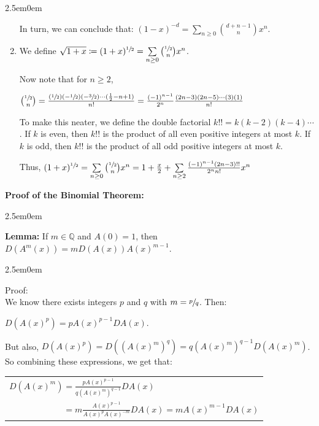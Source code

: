 \documentclass{book}
\newcommand{\hTwo}{%
\color{MidnightBlue}%
   \fontsize{13}{15}\selectfont%
}
\newcommand{\hThree}{%
   \color{PineGreen!85!Orange}
   \fontsize{12}{14}\selectfont%
}
\newcommand{\hFour}{%
   \color{Cyan}
   \fontsize{12}{14}\selectfont%
}
\newenvironment{myIndent}{%
   \begin{adjustwidth}{2.5em}{0em}%
}{%
   \end{adjustwidth}%
}
\newcommand{\blab}[1]{\textbf{#1}}
\newcommand{\retTwo}{\hfill\bigbreak}
\begin{document}
\begin{myIndent}
\begin{enumerate}
      In turn, we can conclude that: $(1 - x)^{-d} = \sum\limits_{n \geq 0}\binom{d+n-1}{n}x^n$.\retTwo

      \item We define $\sqrt{1 + x} \coloneq (1 + x)^{\sfrac{1}{2}} = \sum\limits_{n \geq 0}\binom{\sfrac{1}{2}}{n}x^n$.\retTwo
      
      Now note that for $n \geq 2$,
      
      {\centering$\binom{\sfrac{1}{2}}{n} = \frac{(\sfrac{1}{2})(-\sfrac{1}{2})(-\sfrac{3}{2})\cdots(\frac{1}{2} - n + 1)}{n!} = \frac{(-1)^{n-1}}{2^n}\frac{(2n-3)(2n - 5)\cdots(3)(1)}{n!}$\retTwo\par}

      To make this neater, we define the double factorial $k!! = k(k-2)(k-4)\cdots$. If $k$ is even, then $k!!$ is the product of all even positive integers at most $k$. If $k$ is odd, then $k!!$ is the product of all odd positive integers at most $k$.\retTwo

      Thus, $(1 + x)^{\sfrac{1}{2}}  = \sum\limits_{n \geq 0}\binom{\sfrac{1}{2}}{n}x^n = 1 + \frac{x}{2} + \sum\limits_{n \geq 2}\frac{(-1)^{n-1}(2n-3)!!}{2^nn!}x^n$\retTwo
   \end{enumerate}

   \hTwo
   \blab{Proof of the Binomial Theorem:}
   \begin{myIndent}\hThree
      \blab{Lemma:} If $m \in \mathbb{Q}$ and $A(0) = 1$, then $D(A^m(x)) = mD(A(x)) A(x)^{m-1}$.
      
      \begin{myIndent}\hFour
         Proof:\\
         We know there exists integers $p$ and $q$ with $m = \sfrac{p}{q}$.  Then:
         
         {\centering$D(A(x)^p) = pA(x)^{p-1}DA(x)$.\retTwo\par}
         
         But also, $D(A(x)^p) = D((A(x)^m)^q) = q(A(x)^m)^{q-1}D(A(x)^m)$.\\ So combining these expressions, we get that:

         {\centering 
         \begin{tabular}{l}
            $D(A(x)^m) = \frac{pA(x)^{p-1}}{q(A(x)^m)^{q-1}}DA(x)$\\ [6pt] $\phantom{D(A(x)^m)} = m\frac{A(x)^{p-1}}{A(x)^pA(x)^{-m}}DA(x) = mA(x)^{m-1}DA(x)$ 
         \end{tabular}\retTwo\par}
      \end{myIndent}


\end{myIndent}
\end{myIndent}
\end{document}
